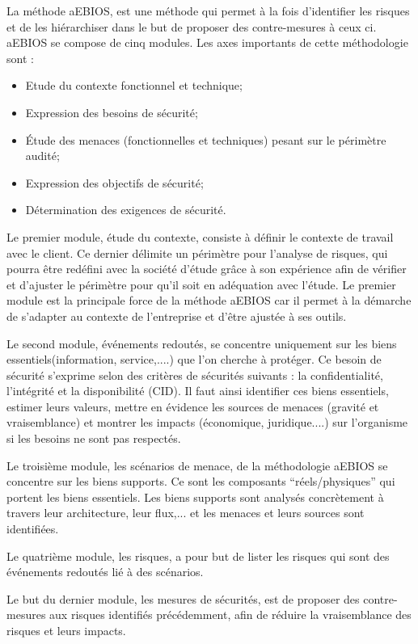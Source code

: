 La méthode  \gls{aEBIOS}, est une méthode qui permet à la fois d’identifier les risques et de les hiérarchiser dans le but de proposer des contre-mesures à ceux ci. 
\gls{aEBIOS} se compose de cinq modules. Les axes importants de cette méthodologie sont :

\begin{itemize}
  \item Etude du contexte fonctionnel et technique;
  \item Expression des besoins de sécurité;
  \item Étude des menaces (fonctionnelles et techniques) pesant sur le périmètre audité;
  \item Expression des objectifs de sécurité;
  \item Détermination des exigences de sécurité.
\end{itemize}

Le premier module, étude du contexte, consiste à définir le contexte de travail avec le client. Ce dernier délimite un périmètre pour l’analyse de risques, qui pourra être redéfini avec la société d’étude grâce à son expérience afin de vérifier et d’ajuster le périmètre pour qu’il soit en adéquation avec l’étude. Le premier module est la principale force de la méthode \gls{aEBIOS} car il permet à la démarche de s’adapter au contexte de l’entreprise et d’être ajustée à ses outils.

Le second module, événements redoutés, se concentre uniquement sur les biens essentiels(information, service,....) que l’on cherche à protéger. Ce besoin de sécurité s’exprime selon des critères de sécurités suivants : la confidentialité, l’intégrité et la disponibilité (CID). Il faut ainsi identifier ces biens essentiels, estimer leurs valeurs, mettre en évidence les sources de menaces (gravité et vraisemblance) et montrer les impacts (économique, juridique....) sur l’organisme si les besoins ne sont pas respectés.

Le troisième module, les scénarios de menace, de la méthodologie \gls{aEBIOS} se concentre sur les biens supports. Ce sont les composants “réels/physiques” qui portent les biens essentiels. Les biens supports sont analysés concrètement à travers leur architecture, leur flux,... et les menaces et leurs sources sont identifiées.

Le quatrième module, les risques, a pour but de lister les risques qui sont des événements redoutés lié à des scénarios.

Le but du dernier module, les mesures de sécurités, est de proposer des contre-mesures aux risques identifiés précédemment, afin de réduire la vraisemblance des risques et leurs impacts.

